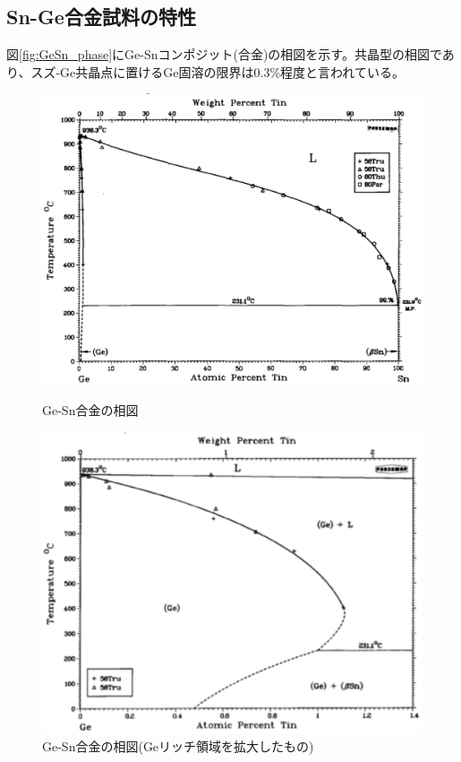 \subsection{Sn-Ge合金試料の特性}
図\ref{fig:GeSn_phase}にGe-Snコンポジット(合金)の相図を示す\cite{Olesinski1984}。共晶型の相図であり、スズ-Ge共晶点に置けるGe固溶の限界は0.3\%程度と言われている\cite{Thurmond1960}。
\begin{figure}[!h]
 \begin{minipage}{\hsize}
    \begin{center}
   \includegraphics[width=0.7\hsize]{Introduction/GeSn_phase.eps}
  \end{center}
  \caption{Ge-Sn合金の相図\cite{Olesinski1984}}
  \label{fig:GeSn_phase}
 \end{minipage}
 \begin{minipage}{\hsize}
    \begin{center}
   \includegraphics[width=0.7\hsize]{Introduction/GeSn_phase2.eps}
  \end{center}
  \caption{Ge-Sn合金の相図(Geリッチ領域を拡大したもの)\cite{Olesinski1984}}
  \label{fig:GeSn_phase2}
   \end{minipage}
\end{figure}

